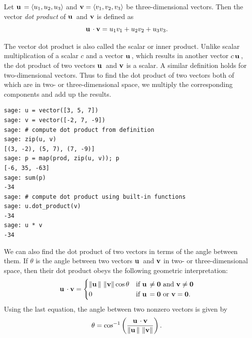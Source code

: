 \begin{definition}
\label{def:vectors_matrices:vector_dot_product}
Let $\operatorname*{\mathbf{u}}{} = \langle u_1, u_2, u_3 \rangle$ and
$\operatorname*{\mathbf{v}} = \langle v_1, v_2, v_3 \rangle$ be
three-dimensional vectors. Then the vector \emph{dot product}
of $\operatorname*{\mathbf{u}}{}$ and $\operatorname*{\mathbf{v}}$ is defined as
\[
\operatorname*{\mathbf{u}}{} \cdot \operatorname*{\mathbf{v}}
=
u_1 v_1 + u_2 v_2 + u_3 v_3.
\]
\end{definition}

The vector dot product is also called the scalar or inner
product. Unlike scalar
multiplication of a scalar $c$ and a vector $\operatorname*{\mathbf{u}}{}$, which results
in another vector $c\operatorname*{\mathbf{u}}{}$, the dot product of two vectors
$\operatorname*{\mathbf{u}}{}$ and $\operatorname*{\mathbf{v}}$ is a scalar. A similar definition holds for
two-dimensional vectors. Thus to find the dot product of two vectors
both of which are in two- or three-dimensional space, we multiply the
corresponding components and add up the results.

\begin{lstlisting}
sage: u = vector([3, 5, 7])
sage: v = vector([-2, 7, -9])
sage: # compute dot product from definition
sage: zip(u, v)
[(3, -2), (5, 7), (7, -9)]
sage: p = map(prod, zip(u, v)); p
[-6, 35, -63]
sage: sum(p)
-34
sage: # compute dot product using built-in functions
sage: u.dot_product(v)
-34
sage: u * v
-34
\end{lstlisting}

We can also find the dot product of two vectors in terms of the angle
between them. If $\theta$ is the angle between two vectors $\operatorname*{\mathbf{u}}{}$
and $\operatorname*{\mathbf{v}}$ in two- or three-dimensional space, then their dot
product obeys the following geometric interpretation:
%
\begin{equation}
\label{eq:vectors_matrices:geometric_interpretation_dot_product}
\operatorname*{\mathbf{u}}{} \cdot \operatorname*{\mathbf{v}}
=
\begin{cases}
\left\Arrowvert \operatorname*{\mathbf{u}}{} \right\Arrowvert \,
\left\Arrowvert \operatorname*{\mathbf{v}} \right\Arrowvert \cos\theta
&\text{if $\operatorname*{\mathbf{u}}{} \neq \operatorname*{\textbf{0}}$ and $\operatorname*{\mathbf{v}} \neq \operatorname*{\textbf{0}}$}\\
0 & \text{if $\operatorname*{\mathbf{u}}{} = \operatorname*{\textbf{0}}$ or $\operatorname*{\mathbf{v}} = \operatorname*{\textbf{0}}$}.
\end{cases}
\end{equation}
%
Using the last equation, the angle between two nonzero vectors is
given by
%
\begin{equation}
\label{eq:vectors_matrices:angle_between_vectors}
\theta
=
\cos^{-1}
\left(
\frac {\operatorname*{\mathbf{u}}{} \cdot \operatorname*{\mathbf{v}}}
{\left\Arrowvert \operatorname*{\mathbf{u}}{} \right\Arrowvert \, \left\Arrowvert \operatorname*{\mathbf{v}} \right\Arrowvert}
\right).
\end{equation}

